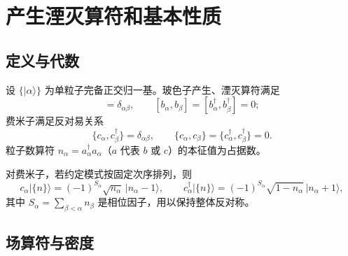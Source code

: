 \section{产生湮灭算符和基本性质}

\subsection{定义与代数}

设 $\{\lvert\alpha\rangle\}$ 为单粒子完备正交归一基。玻色子产生、湮灭算符满足
\begin{equation}
  [b_\alpha,b_\beta^\dagger]=\delta_{\alpha\beta},
  \qquad
  [b_\alpha,b_\beta]=[b_\alpha^\dagger,b_\beta^\dagger]=0;
\end{equation}
费米子满足反对易关系
\begin{equation}
  \{c_\alpha,c_\beta^\dagger\}=\delta_{\alpha\beta},
  \qquad
  \{c_\alpha,c_\beta\}=\{c_\alpha^\dagger,c_\beta^\dagger\}=0.
\end{equation}
粒子数算符 $n_\alpha=a_\alpha^\dagger a_\alpha$（$a$ 代表 $b$ 或 $c$）的本征值为占据数。

对费米子，若约定模式按固定次序排列，则
\begin{equation}
  c_\alpha\lvert\{n\}\rangle
  =(-1)^{S_\alpha}\sqrt{n_\alpha}\,\lvert n_\alpha-1\rangle,
  \qquad
  c_\alpha^\dagger\lvert\{n\}\rangle
  =(-1)^{S_\alpha}\sqrt{1-n_\alpha}\,\lvert n_\alpha+1\rangle,
\end{equation}
其中 $S_\alpha=\sum_{\beta<\alpha}n_\beta$ 是相位因子，用以保持整体反对称。

\subsection{场算符与密度}

